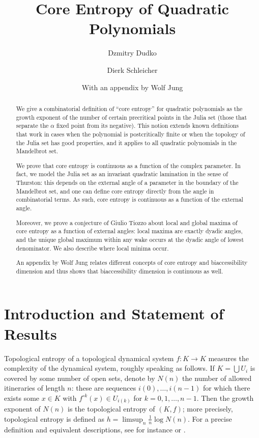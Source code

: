 \documentclass[12pt]{amsart}
\title[Core Entropy of Quadratic Polynomials]{Core Entropy of Quadratic Polynomials %
}
\author{Dzmitry Dudko}
\author{Dierk Schleicher}
\author[]{With an appendix by Wolf Jung}
\newcommand{\0}{\texttt{0}}
\newcommand{\1}{\texttt{1}}
\theoremstyle{definition}
\numberwithin{equation}{section}
\begin{document}
\begin{abstract}
We give a combinatorial definition of ``core entropy'' for quadratic polynomials as the growth exponent of the number of certain precritical points in the Julia set (those that separate the $\alpha$ fixed point from its negative). This notion extends known definitions that work in cases when the polynomial is postcritically finite or when the topology of the Julia set has good properties, and it applies to all quadratic polynomials in the Mandelbrot set.

We prove that core entropy is continuous as a function of the complex parameter. In fact, we model the Julia set as an invariant quadratic lamination in the sense of Thurston: this depends on the external angle of a parameter in the boundary of the Mandelbrot set, and one can define core entropy directly from the angle in combinatorial terms. As such, core entropy is continuous as a function of the external angle.

Moreover, we prove a conjecture of Giulio Tiozzo about local and global maxima of core entropy as a function of external angles: local maxima are exactly dyadic angles, and the unique global maximum within any wake occurs at the dyadic angle of lowest denominator. We also describe where local minima occur.

An appendix by Wolf Jung relates different concepts of core entropy and biaccessibility dimension and thus shows that biaccessibility dimension is continuous as well.
\end{abstract}

\maketitle

\section{Introduction and Statement of Results}

Topological entropy of a topological dynamical system $f\colon K\to K$ measures the complexity of the dynamical system, roughly speaking as follows. If $K=\bigcup U_i$ is covered by some number of open sets, denote by $N(n)$ the number of allowed itineraries of length $n$: these are sequences $i(0),\dots,i(n-1)$ for which there exists some $x\in K$ with $f^{\circ k}(x)\in U_{i(k)}$ for $k=0,1,\dots,n-1$. Then the growth exponent of $N(n)$ is the topological entropy of $(K,f)$; more precisely, topological entropy is defined as $h=\limsup_n\frac{1}n \log N(n)$. For a precise definition and equivalent descriptions, see for instance \cite{BrinStuck} or \cite{deMelovanStrien}.
\end{document}
